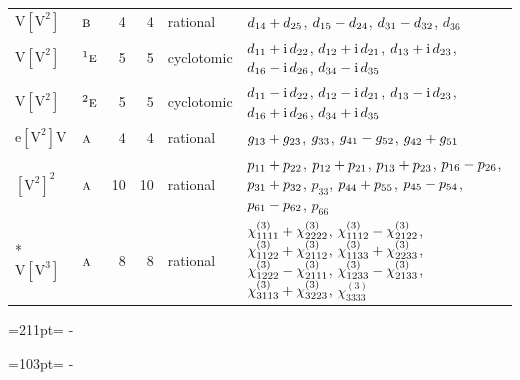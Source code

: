 \documentclass[10pt,a4paper]{article}
\newcommand{\needspace}[1]{\par\penalty-100\begingroup\dimen0=#1\relax\dimen2=\pagegoal
  \advance\dimen2-\pagetotal\ifdim\dimen0>\dimen2\relax\ifdim\dimen2>0pt\vfil\break\fi\fi
  \endgroup}
\numberwithin{equation}{section}
\newcommand{\irr}[1]{\text{\normalfont\scshape #1}}
\newcommand{\conjpair}[1]{{}^{#1}}
\newcommand{\iunit}{\mathrm{i}}
\newcommand{\jahn}[1]{\mathrm{#1}}
\newlength{\fillwidth}\newlength{\cellwidth}\newlength{\colwidth}
\newcommand{\signbreak}{\penalty100\relax}
\begin{document}
{\begin{longtable}{@{}llrrl>{\RaggedRight\arraybackslash}p{\fillwidth}@{}}
$\jahn{V[V^{2}]}$ & $\irr{b}$ & 4 & 4 & rational & $d_{14} +\signbreak d_{25}$, $d_{15} -\signbreak d_{24}$, $d_{31} -\signbreak d_{32}$, $d_{36}$\\
$\jahn{V[V^{2}]}$ & $\conjpair{1}\irr{e}$ & 5 & 5 & cyclotomic & $d_{11} +\signbreak \iunit{}\,d_{22}$, $d_{12} +\signbreak \iunit{}\,d_{21}$, $d_{13} +\signbreak \iunit{}\,d_{23}$, $d_{16} -\signbreak \iunit{}\,d_{26}$, $d_{34} -\signbreak \iunit{}\,d_{35}$\\
$\jahn{V[V^{2}]}$ & $\conjpair{2}\irr{e}$ & 5 & 5 & cyclotomic & $d_{11} -\signbreak \iunit{}\,d_{22}$, $d_{12} -\signbreak \iunit{}\,d_{21}$, $d_{13} -\signbreak \iunit{}\,d_{23}$, $d_{16} +\signbreak \iunit{}\,d_{26}$, $d_{34} +\signbreak \iunit{}\,d_{35}$\\
$\jahn{e[V^{2}]V}$ & $\irr{a}$ & 4 & 4 & rational & $\mathnormal{g}_{13} +\signbreak \mathnormal{g}_{23}$, $\mathnormal{g}_{33}$, $\mathnormal{g}_{41} -\signbreak \mathnormal{g}_{52}$, $\mathnormal{g}_{42} +\signbreak \mathnormal{g}_{51}$\\
$\jahn{[V^{2}]^{2}}$ & $\irr{a}$ & 10 & 10 & rational & $p_{11} +\signbreak p_{22}$, $p_{12} +\signbreak p_{21}$, $p_{13} +\signbreak p_{23}$, $p_{16} -\signbreak p_{26}$, $p_{31} +\signbreak p_{32}$, $p_{33}$, $p_{44} +\signbreak p_{55}$, $p_{45} -\signbreak p_{54}$, $p_{61} -\signbreak p_{62}$, $p_{66}$\\*
$\jahn{V[V^{3}]}$ & $\irr{a}$ & 8 & 8 & rational & $\chi^{(3)}_{1111} +\signbreak \chi^{(3)}_{2222}$, $\chi^{(3)}_{1112} -\signbreak \chi^{(3)}_{2122}$, $\chi^{(3)}_{1122} +\signbreak \chi^{(3)}_{2112}$, $\chi^{(3)}_{1133} +\signbreak \chi^{(3)}_{2233}$, $\chi^{(3)}_{1222} -\signbreak \chi^{(3)}_{2111}$, $\chi^{(3)}_{1233} -\signbreak \chi^{(3)}_{2133}$, $\chi^{(3)}_{3113} +\signbreak \chi^{(3)}_{3223}$, $\chi^{(3)}_{3333}$\\
\bottomrule\end{longtable}}
\needspace{211pt}
\needspace{103pt}
\end{document}
